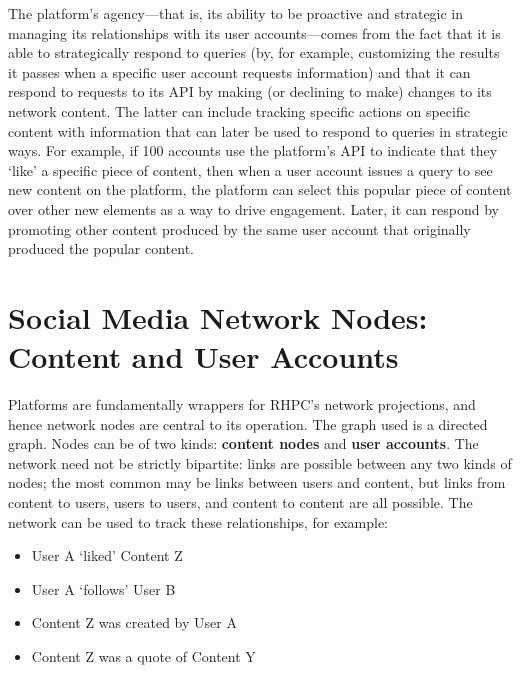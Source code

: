 The platform's agency---that is, its ability to be proactive and strategic in managing its relationships with its user accounts---comes from the fact that it is able to strategically respond to queries (by, for example, customizing the results it passes when a specific user account requests information) and that it can respond to requests to its API by making (or declining to make) changes to its network content. The latter can include tracking specific actions on specific content with information that can later be used to respond to queries in strategic ways. For example, if 100 accounts use the platform's API to indicate that they `like' a specific piece of content, then when a user account issues a query to see new content on the platform, the platform can select this popular piece of content over other new elements as a way to drive engagement. Later, it can respond by promoting other content produced by the same user account that originally produced the popular content.


\section{Social Media Network Nodes: Content and User Accounts}
Platforms are fundamentally wrappers for RHPC's network projections, and hence network nodes are central to its operation. The graph used is a directed graph. Nodes can be of two kinds: \textbf{content nodes} and \textbf{user accounts}. The network need not be strictly bipartite: links are possible between any two kinds of nodes; the most common may be links between users and content, but links from content to users, users to users, and content to content are all possible. The network can be used to track these relationships, for example:

\begin{itemize}
\item User A `liked' Content Z
\item User A `follows' User B
\item Content Z was created by User A
\item Content Z was a quote of Content Y
\end{itemize}


